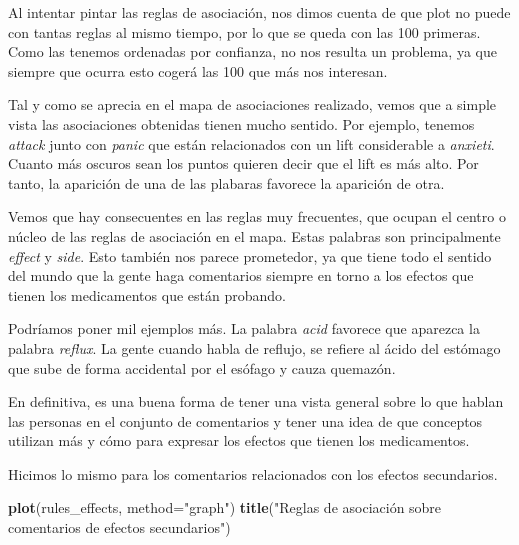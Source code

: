 \documentclass[spanish,]{article}
\newenvironment{Shaded}{\begin{snugshade}}{\end{snugshade}}
\newcommand{\KeywordTok}[1]{\textcolor[rgb]{0.13,0.29,0.53}{\textbf{#1}}}
\newcommand{\DataTypeTok}[1]{\textcolor[rgb]{0.13,0.29,0.53}{#1}}
\newcommand{\StringTok}[1]{\textcolor[rgb]{0.31,0.60,0.02}{#1}}
\newcommand{\NormalTok}[1]{#1}
\begin{document}
Al intentar pintar las reglas de asociación, nos dimos cuenta de que
plot no puede con tantas reglas al mismo tiempo, por lo que se queda con
las 100 primeras. Como las tenemos ordenadas por confianza, no nos
resulta un problema, ya que siempre que ocurra esto cogerá las 100 que
más nos interesan.

Tal y como se aprecia en el mapa de asociaciones realizado, vemos que a
simple vista las asociaciones obtenidas tienen mucho sentido. Por
ejemplo, tenemos \emph{attack} junto con \emph{panic} que están
relacionados con un lift considerable a \emph{anxieti}. Cuanto más
oscuros sean los puntos quieren decir que el lift es más alto. Por
tanto, la aparición de una de las plabaras favorece la aparición de
otra.

Vemos que hay consecuentes en las reglas muy frecuentes, que ocupan el
centro o núcleo de las reglas de asociación en el mapa. Estas palabras
son principalmente \emph{effect} y \emph{side}. Esto también nos parece
prometedor, ya que tiene todo el sentido del mundo que la gente haga
comentarios siempre en torno a los efectos que tienen los medicamentos
que están probando.

Podríamos poner mil ejemplos más. La palabra \emph{acid} favorece que
aparezca la palabra \emph{reflux}. La gente cuando habla de reflujo, se
refiere al ácido del estómago que sube de forma accidental por el
esófago y cauza quemazón.

En definitiva, es una buena forma de tener una vista general sobre lo
que hablan las personas en el conjunto de comentarios y tener una idea
de que conceptos utilizan más y cómo para expresar los efectos que
tienen los medicamentos.

Hicimos lo mismo para los comentarios relacionados con los efectos
secundarios.

\begin{Shaded}
\begin{Highlighting}[]
\KeywordTok{plot}\NormalTok{(rules_effects, }\DataTypeTok{method=}\StringTok{"graph"}\NormalTok{)}
\KeywordTok{title}\NormalTok{(}\StringTok{"Reglas de asociación sobre comentarios de efectos secundarios"}\NormalTok{)}
\end{Highlighting}
\end{Shaded}
\end{document}
